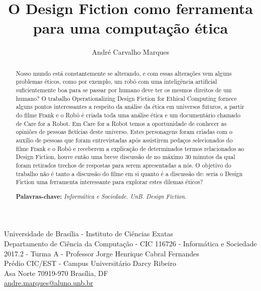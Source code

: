 \documentclass[12pt]{article}
\begin{document}
	\title{O Design Fiction como ferramenta para uma computação ética}

	\author{André Carvalho Marques}

	\renewcommand{\tablename}{Quadro}

	\newcommand{\address}{{
			\begin{center}
				\footnotesize
				Universidade de Brasília - Instituto de Ciências Exatas\\  Departamento de Ciência da Computação - CIC 116726 - Informática e Sociedade \\
				2017.2 - Turma A - Professor Jorge Henrique Cabral Fernandes\\ Prédio CIC/EST - Campus Universitário Darcy Ribeiro \\Asa Norte 70919-970 Brasília, DF\\
				\href{mailto:andre.marques@aluno.unb.br}{andre.marques@aluno.unb.br}
			\end{center}
	}}

	\maketitle
	\address

	\begin{abstract}
		Nosso mundo está constantemente se alterando, e com essas alterações vem alguns problemas éticos, como por exemplo, um robô com uma inteligência artificial suficientemente boa para se passar por humano deve ter os mesmos direitos de um humano? O trabalho Operationalizing Design Fiction for Ethical Computing fornece alguns pontos interessantes a respeito da análise da ética em universos futuros, a partir do filme Frank e o Robô é criada toda uma análise ética e um documentário chamado de Care for a Robot. Em Care for a Robot temos a oportunidade de conhecer as opiniões de pessoas fictícias deste universo. Estes personagens foram criadas com o auxílio de pessoas que foram entrevistadas após assistirem pedaços selecionados do filme Frank e o Robô e receberem a explicação de determinados termos relacionados ao Design Fiction, houve então uma breve discussão de no máximo 30 minutos da qual foram retirados trechos de respostas para serem apresentadas a nós. O objetivo do trabalho não é tanto a discussão do filme em si quanto é a discussão de: seria o Design Fiction uma ferramenta interessante para explorar estes dilemas éticos?

		\textbf{Palavras-chave:} \textit{Informática e Sociedade. UnB. Design Fiction.}
	\end{abstract}
\end{document}
